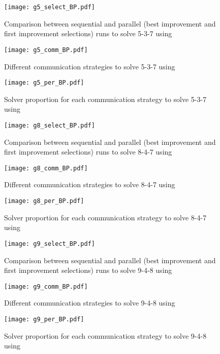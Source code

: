 \begin{figure}[!h]
\centering
\texttt{[image: g5\_select\_BP.pdf]}
\caption{Comparison between sequential and parallel (best improvement and first improvement selections) runs to solve \SGP{} 5-3-7 using \posl}
\end{figure}

\begin{figure}[!h]
\centering
\texttt{[image: g5\_comm\_BP.pdf]}
\caption{Different communication strategies to solve \SGP{} 5-3-7 using \posl}\label{boxplot:5comm}
\end{figure}

\begin{figure}[!h]
\centering
\texttt{[image: g5\_per\_BP.pdf]}
\caption{Solver proportion for each communication strategy to solve \SGP{} 5-3-7 using \posl}\label{barplot:5}
\end{figure}


\begin{figure}[!h]
\centering
\texttt{[image: g8\_select\_BP.pdf]}
\caption{Comparison between sequential and parallel (best improvement and first improvement selections) runs to solve \SGP{} 8-4-7 using \posl}
\end{figure}

\begin{figure}[!h]
\centering
\texttt{[image: g8\_comm\_BP.pdf]}
\caption{Different communication strategies to solve \SGP{} 8-4-7 using \posl}\label{boxplot:8comm}
\end{figure}

\begin{figure}[!h]
\centering
\texttt{[image: g8\_per\_BP.pdf]}
\caption{Solver proportion for each communication strategy to solve \SGP{} 8-4-7 using \posl}\label{barplot:8}
\end{figure}


\begin{figure}[!h]
\centering
\texttt{[image: g9\_select\_BP.pdf]}
\caption{Comparison between sequential and parallel (best improvement and first improvement selections) runs to solve \SGP{} 9-4-8 using \posl}
\end{figure}

\begin{figure}[!h]
\centering
\texttt{[image: g9\_comm\_BP.pdf]}
\caption{Different communication strategies to solve \SGP{} 9-4-8 using \posl}\label{boxplot:9comm}
\end{figure}

\begin{figure}[!h]
\centering
\texttt{[image: g9\_per\_BP.pdf]}
\caption{Solver proportion for each communication strategy to solve \SGP{} 9-4-8 using \posl}\label{barplot:9}
\end{figure}